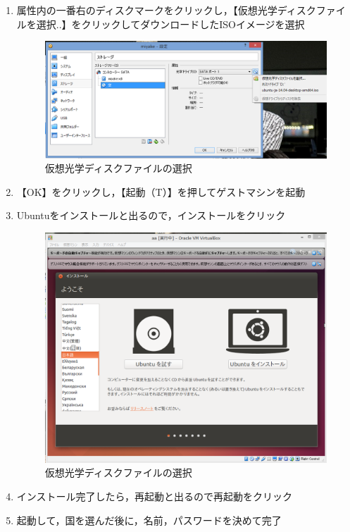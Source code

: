 \begin{enumerate}
  \item 属性内の一番右のディスクマークをクリックし，【仮想光学ディスクファイルを選択..】をクリックしてダウンロードしたISOイメージを選択

\begin{figure}[H]
\centering
\includegraphics[width=15cm]{kasoukougaku.PNG}
\caption{仮想光学ディスクファイルの選択}\label{サンプル図}
\end{figure}
 

 \item 【OK】をクリックし，【起動（T）】を押してゲストマシンを起動
  \item Ubuntuをインストールと出るので，インストールをクリック


\begin{figure}[H]
\centering
\includegraphics[width=15cm]{instal.PNG}
\caption{仮想光学ディスクファイルの選択}\label{サンプル図}
\end{figure}

  \item インストール完了したら，再起動と出るので再起動をクリック
　\item 起動して，国を選んだ後に，名前，パスワードを決めて完了
\end{enumerate}



